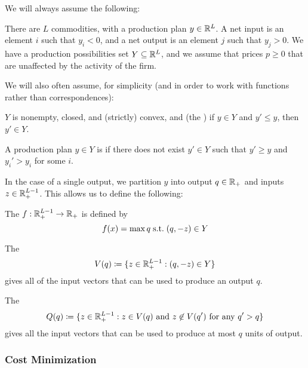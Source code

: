 \documentclass[12pt]{article}
\begin{document}
We will always assume the following:

\begin{assumption}
	There are $L$ commodities, with a production plan $y \in \mathbb{R}^L$. A net input is an element $i$ such that $y_i < 0$, and a net output is an element $j$ such that $y_j > 0$. We have a production possibilities set $Y \subseteq \mathbb{R}^L$, and we assume that prices $p \ge 0$ that are unaffected by the activity of the firm.
\end{assumption}

We will also often assume, for simplicity (and in order to work with functions rather than correspondences):
\begin{assumption}
	$Y$ is nonempty, closed, and (strictly) convex, and (the ) if $y \in Y$ and $y' \le y$, then $y' \in Y$.
\end{assumption}

\begin{definition}
	A production plan $y \in Y$ is  if there does not exist $y' \in Y$ such that $y' \ge y$ and $y_i' > y_i$ for some $i$.
\end{definition}

In the case of a single output, we partition $y$ into output $q \in \mathbb{R}_+$ and inputs $z \in \mathbb{R}^{L-1}_+$. This allows us to define the following:

\begin{definition}
	The  $f:\mathbb{R}^{L-1}_+ \to \mathbb{R}_+$ is defined by 
	\[
	f(x) = \max q \;\text{s.t.}\; (q,-z) \in Y
	\]
\end{definition}

\begin{definition}
	The 
	\[
	V(q) \coloneqq \{z \in \mathbb{R}_+^{L-1} : (q,-z) \in Y\}
	\]
	gives all of the input vectors that can be used to produce an output $q$.
\end{definition}

\begin{definition}
	The  
	\[
	Q(q) \coloneqq \{z \in \mathbb{R}_+^{L-1} : z \in V(q) \text{ and } z \not\in V(q') \text{ for any } q' > q\}
	\]
	gives all the input vectors that can be used to produce at most $q$ units of output.
\end{definition}

\subsubsection{Cost Minimization}
\end{document}
